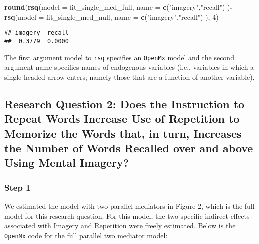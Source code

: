 \documentclass[11pt,]{article}
\newenvironment{Shaded}{\begin{snugshade}}{\end{snugshade}}
\newcommand{\DataTypeTok}[1]{\textcolor[rgb]{0.13,0.29,0.53}{#1}}
\newcommand{\DecValTok}[1]{\textcolor[rgb]{0.00,0.00,0.81}{#1}}
\newcommand{\KeywordTok}[1]{\textcolor[rgb]{0.13,0.29,0.53}{\textbf{#1}}}
\newcommand{\NormalTok}[1]{#1}
\newcommand{\OperatorTok}[1]{\textcolor[rgb]{0.81,0.36,0.00}{\textbf{#1}}}
\newcommand{\StringTok}[1]{\textcolor[rgb]{0.31,0.60,0.02}{#1}}
\begin{document}
\begin{Shaded}
\begin{Highlighting}[]
\KeywordTok{round}\NormalTok{(}\KeywordTok{rsq}\NormalTok{(}\DataTypeTok{model =}\NormalTok{ fit_single_med_full, }\DataTypeTok{name =} \KeywordTok{c}\NormalTok{(}\StringTok{"imagery"}\NormalTok{,}\StringTok{"recall"}\NormalTok{) )}\OperatorTok{-}\KeywordTok{rsq}\NormalTok{(}\DataTypeTok{model =}\NormalTok{ fit_single_med_null, }\DataTypeTok{name =} \KeywordTok{c}\NormalTok{(}\StringTok{"imagery"}\NormalTok{,}\StringTok{"recall"}\NormalTok{) ), }\DecValTok{4}\NormalTok{)}
\end{Highlighting}
\end{Shaded}

\begin{verbatim}
## imagery  recall 
##  0.3779  0.0000
\end{verbatim}

The first argument model to \texttt{rsq} specifies an \texttt{OpenMx}
model and the second argument name specifies names of endogenous
variables (i.e., variables in which a single headed arrow enters; namely
those that are a function of another variable).

\hypertarget{research-question-2-does-the-instruction-to-repeat-words-increase-use-of-repetition-to-memorize-the-words-that-in-turn-increases-the-number-of-words-recalled-over-and-above-using-mental-imagery}{%
\subsection{Research Question 2: Does the Instruction to Repeat Words
Increase Use of Repetition to Memorize the Words that, in turn,
Increases the Number of Words Recalled over and above Using Mental
Imagery?}\label{research-question-2-does-the-instruction-to-repeat-words-increase-use-of-repetition-to-memorize-the-words-that-in-turn-increases-the-number-of-words-recalled-over-and-above-using-mental-imagery}}

\hypertarget{step-1-1}{%
\subsubsection{Step 1}\label{step-1-1}}

We estimated the model with two parallel mediators in Figure 2, which is
the full model for this research question. For this model, the two
specific indirect effects associated with Imagery and Repetition were
freely estimated. Below is the \texttt{OpenMx} code for the full
parallel two mediator model:
\end{document}
